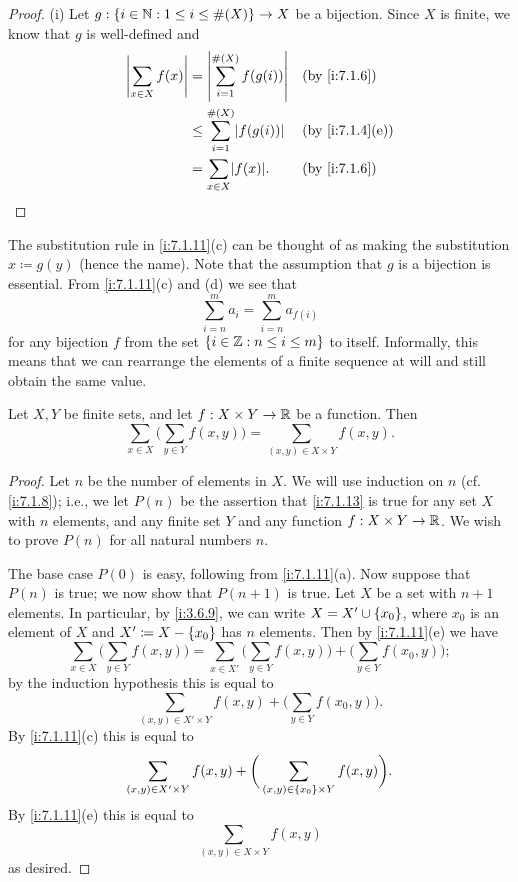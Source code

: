\begin{proof}{(i)}
  Let \(g : \left\lbrace i \in \mathbb{N} : 1 \leq i \leq \#(X)\right\rbrace \to X\) be a bijection.
  Since \(X\) is finite, we know that \(g\) is well-defined and
  \begin{align*}
    \abs{\sum_{x \in X} f(x)} & = \abs{\sum_{i = 1}^{\#(X)} f(g(i))}    &  & \by{i:7.1.6}    \\
                              & \leq \sum_{i = 1}^{\#(X)} \abs{f(g(i))} &  & \by{i:7.1.4}[e] \\
                              & = \sum_{x \in X} \abs{f(x)}.            &  & \by{i:7.1.6}
  \end{align*}
\end{proof}

\begin{rmk}\label{i:7.1.12}
  The substitution rule in \cref{i:7.1.11}(c) can be thought of as making the substitution \(x \coloneqq g(y)\) (hence the name).
  Note that the assumption that \(g\) is a bijection is essential.
  From \cref{i:7.1.11}(c) and (d) we see that
  \[
    \sum_{i = n}^m a_i = \sum_{i = n}^m a_{f(i)}
  \]
  for any bijection \(f\) from the set \(\left\lbrace i \in \mathbb{Z} : n \leq i \leq m\right\rbrace\) to itself.
  Informally, this means that we can rearrange the elements of a finite sequence at will and still obtain the same value.
\end{rmk}

\begin{lem}\label{i:7.1.13}
  Let \(X, Y\) be finite sets, and let \(f : X \times Y \to \mathbb{R}\) be a function.
  Then
  \[
    \sum_{x \in X} \bigg(\sum_{y \in Y} f(x, y)\bigg) = \sum_{(x, y) \in X \times Y} f(x, y).
  \]
\end{lem}

\begin{proof}
  Let \(n\) be the number of elements in \(X\).
  We will use induction on \(n\) (cf. \cref{i:7.1.8});
  i.e., we let \(P(n)\) be the assertion that \cref{i:7.1.13} is true for any set \(X\) with \(n\) elements, and any finite set \(Y\) and any function \(f : X \times Y \to \mathbb{R}\).
  We wish to prove \(P(n)\) for all natural numbers \(n\).

  The base case \(P(0)\) is easy, following from \cref{i:7.1.11}(a).
  Now suppose that \(P(n)\) is true;
  we now show that \(P(n + 1)\) is true.
  Let \(X\) be a set with \(n + 1\) elements.
  In particular, by \cref{i:3.6.9}, we can write \(X = X' \cup \left\lbrace x_0\right\rbrace\), where \(x_0\) is an element of \(X\) and \(X' \coloneqq X - \left\lbrace x_0\right\rbrace\) has \(n\) elements.
  Then by \cref{i:7.1.11}(e) we have
  \[
    \sum_{x \in X} \bigg(\sum_{y \in Y} f(x, y)\bigg) = \sum_{x \in X'} \bigg(\sum_{y \in Y} f(x, y)\bigg) + \bigg(\sum_{y \in Y} f(x_0, y)\bigg);
  \]
  by the induction hypothesis this is equal to
  \[
    \sum_{(x, y) \in X' \times Y} f(x, y) + \bigg(\sum_{y \in Y} f(x_0, y)\bigg).
  \]
  By \cref{i:7.1.11}(c) this is equal to
  \[
    \sum_{(x, y) \in X' \times Y} f(x, y) + \bigg(\sum_{(x, y) \in \left\lbrace x_0\right\rbrace \times Y} f(x, y)\bigg).
  \]
  By \cref{i:7.1.11}(e) this is equal to
  \[
    \sum_{(x, y) \in X \times Y} f(x, y)
  \]
  as desired.
\end{proof}

